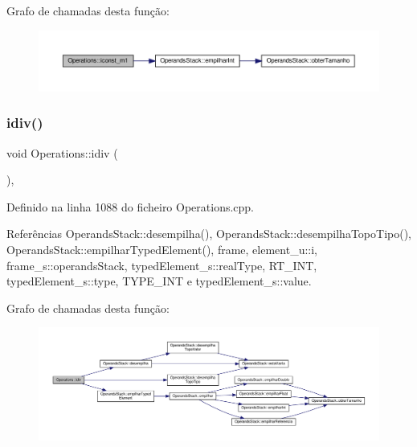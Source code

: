 Grafo de chamadas desta função\+:\nopagebreak
\begin{figure}[H]
\begin{center}
\leavevmode
\includegraphics[width=350pt]{classOperations_abb57552d42047d4b685b2d68db6b1fd7_cgraph}
\end{center}
\end{figure}
\mbox{\label{classOperations_a5bf24c3cc02a8282c21a37cd7b7ba5d3}} 
\subsubsection{\texorpdfstring{idiv()}{idiv()}}
{\footnotesize\ttfamily void Operations\+::idiv (\begin{DoxyParamCaption}{ }\end{DoxyParamCaption})\hspace{0.3cm}{\ttfamily [static]}, {\ttfamily [private]}}



Definido na linha 1088 do ficheiro Operations.\+cpp.



Referências Operands\+Stack\+::desempilha(), Operands\+Stack\+::desempilha\+Topo\+Tipo(), Operands\+Stack\+::empilhar\+Typed\+Element(), frame, element\+\_\+u\+::i, frame\+\_\+s\+::operands\+Stack, typed\+Element\+\_\+s\+::real\+Type, R\+T\+\_\+\+I\+NT, typed\+Element\+\_\+s\+::type, T\+Y\+P\+E\+\_\+\+I\+NT e typed\+Element\+\_\+s\+::value.

Grafo de chamadas desta função\+:\nopagebreak
\begin{figure}[H]
\begin{center}
\leavevmode
\includegraphics[width=350pt]{classOperations_a5bf24c3cc02a8282c21a37cd7b7ba5d3_cgraph}
\end{center}
\end{figure}
\mbox{\label{classOperations_aa0432645b0d0effb4d4d839ea2dcec1c}} 
